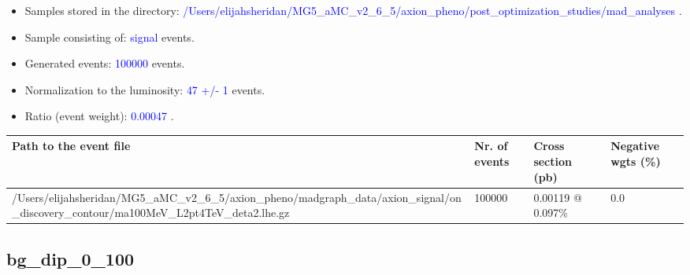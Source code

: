 \documentclass[a4paper, 10pt]{article}
\begin{document}
\begin{itemize}
  \item Samples stored in the directory: \textcolor{blue}{/\-Users/\-elijahsheridan/\-MG5\_aMC\_v2\_6\_5/\-axion\_pheno/\-post\_optimization\_studies/\-mad\_analyses} .
   \item Sample consisting of: \textcolor{blue}{signal}  events.
   \item Generated events: \textcolor{blue}{100000 }  events.
   \item Normalization to the luminosity: \textcolor{blue}{47}\textcolor{blue}{ +/\-- }\textcolor{blue}{1 }  events.
   \item Ratio (event weight): \textcolor{blue}{0.00047 } .  
 
\end{itemize}
\begin{table}[H]
  \begin{center}
    \begin{tabular}{|m{55.0mm}|m{25.0mm}|m{30.0mm}|m{30.0mm}|}
      \hline
      {\cellcolor{yellow}         Path to the event file}& {\cellcolor{yellow}         Nr. of events}& {\cellcolor{yellow}         Cross section (pb)}& {\cellcolor{yellow}         Negative wgts (\%)}\\
      \hline
      {\cellcolor{white}          /\-Users/\-elijahsheridan/\-MG5\_aMC\_v2\_6\_5/\-axion\_pheno/\-madgraph\_data/\-axion\_signal/\-on\_discovery\_contour/\-ma100MeV\_L2pt4TeV\_deta2.lhe.gz}& {\cellcolor{white}          100000}& {\cellcolor{white}          0.00119 @ 0.097\%}& {\cellcolor{white}          0.0}\\
\hline
    \end{tabular}
  \end{center}
\end{table}

\subsection{ bg\_dip\_0\_100}
\end{document}
